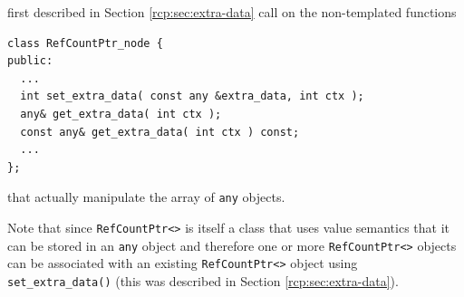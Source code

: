 {}\noindent{}first described in Section {}\ref{rcp:sec:extra-data}
call on the non-templated functions

{\scriptsize\begin{verbatim}
class RefCountPtr_node {
public:
  ...
  int set_extra_data( const any &extra_data, int ctx );
  any& get_extra_data( int ctx );
  const any& get_extra_data( int ctx ) const;
  ...
};
\end{verbatim}}

{}\noindent{}that actually manipulate the array of {}\texttt{any}
objects.

Note that since {}\texttt{Ref\-Count\-Ptr<>} is itself a class that
uses value semantics that it can be stored in an {}\texttt{any} object
and therefore one or more {}\texttt{Ref\-Count\-Ptr<>} objects can be
associated with an existing {}\texttt{Ref\-Count\-Ptr<>} object using
{}\texttt{set\-\_extra\-\_data()} (this was described in Section
{}\ref{rcp:sec:extra-data}).
